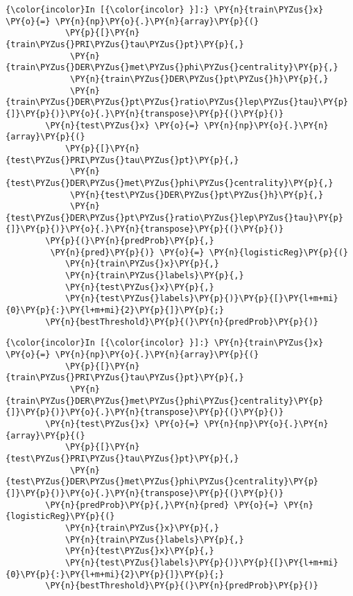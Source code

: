    \begin{Verbatim}[commandchars=\\\{\}]
{\color{incolor}In [{\color{incolor} }]:} \PY{n}{train\PYZus{}x} \PY{o}{=} \PY{n}{np}\PY{o}{.}\PY{n}{array}\PY{p}{(}
            \PY{p}{[}\PY{n}{train\PYZus{}PRI\PYZus{}tau\PYZus{}pt}\PY{p}{,}
             \PY{n}{train\PYZus{}DER\PYZus{}met\PYZus{}phi\PYZus{}centrality}\PY{p}{,}
             \PY{n}{train\PYZus{}DER\PYZus{}pt\PYZus{}h}\PY{p}{,}
             \PY{n}{train\PYZus{}DER\PYZus{}pt\PYZus{}ratio\PYZus{}lep\PYZus{}tau}\PY{p}{]}\PY{p}{)}\PY{o}{.}\PY{n}{transpose}\PY{p}{(}\PY{p}{)}
        \PY{n}{test\PYZus{}x} \PY{o}{=} \PY{n}{np}\PY{o}{.}\PY{n}{array}\PY{p}{(}
            \PY{p}{[}\PY{n}{test\PYZus{}PRI\PYZus{}tau\PYZus{}pt}\PY{p}{,}
             \PY{n}{test\PYZus{}DER\PYZus{}met\PYZus{}phi\PYZus{}centrality}\PY{p}{,}
             \PY{n}{test\PYZus{}DER\PYZus{}pt\PYZus{}h}\PY{p}{,}
             \PY{n}{test\PYZus{}DER\PYZus{}pt\PYZus{}ratio\PYZus{}lep\PYZus{}tau}\PY{p}{]}\PY{p}{)}\PY{o}{.}\PY{n}{transpose}\PY{p}{(}\PY{p}{)}
        \PY{p}{(}\PY{n}{predProb}\PY{p}{,}
         \PY{n}{pred}\PY{p}{)} \PY{o}{=} \PY{n}{logisticReg}\PY{p}{(}
            \PY{n}{train\PYZus{}x}\PY{p}{,}
            \PY{n}{train\PYZus{}labels}\PY{p}{,}
            \PY{n}{test\PYZus{}x}\PY{p}{,}
            \PY{n}{test\PYZus{}labels}\PY{p}{)}\PY{p}{[}\PY{l+m+mi}{0}\PY{p}{:}\PY{l+m+mi}{2}\PY{p}{]}\PY{p}{;}
        \PY{n}{bestThreshold}\PY{p}{(}\PY{n}{predProb}\PY{p}{)}
\end{Verbatim}

    \begin{Verbatim}[commandchars=\\\{\}]
{\color{incolor}In [{\color{incolor} }]:} \PY{n}{train\PYZus{}x} \PY{o}{=} \PY{n}{np}\PY{o}{.}\PY{n}{array}\PY{p}{(}
            \PY{p}{[}\PY{n}{train\PYZus{}PRI\PYZus{}tau\PYZus{}pt}\PY{p}{,}
             \PY{n}{train\PYZus{}DER\PYZus{}met\PYZus{}phi\PYZus{}centrality}\PY{p}{]}\PY{p}{)}\PY{o}{.}\PY{n}{transpose}\PY{p}{(}\PY{p}{)}
        \PY{n}{test\PYZus{}x} \PY{o}{=} \PY{n}{np}\PY{o}{.}\PY{n}{array}\PY{p}{(}
            \PY{p}{[}\PY{n}{test\PYZus{}PRI\PYZus{}tau\PYZus{}pt}\PY{p}{,}
             \PY{n}{test\PYZus{}DER\PYZus{}met\PYZus{}phi\PYZus{}centrality}\PY{p}{]}\PY{p}{)}\PY{o}{.}\PY{n}{transpose}\PY{p}{(}\PY{p}{)}
        \PY{n}{predProb}\PY{p}{,}\PY{n}{pred} \PY{o}{=} \PY{n}{logisticReg}\PY{p}{(}
            \PY{n}{train\PYZus{}x}\PY{p}{,}
            \PY{n}{train\PYZus{}labels}\PY{p}{,}
            \PY{n}{test\PYZus{}x}\PY{p}{,}
            \PY{n}{test\PYZus{}labels}\PY{p}{)}\PY{p}{[}\PY{l+m+mi}{0}\PY{p}{:}\PY{l+m+mi}{2}\PY{p}{]}\PY{p}{;}
        \PY{n}{bestThreshold}\PY{p}{(}\PY{n}{predProb}\PY{p}{)}
\end{Verbatim}

